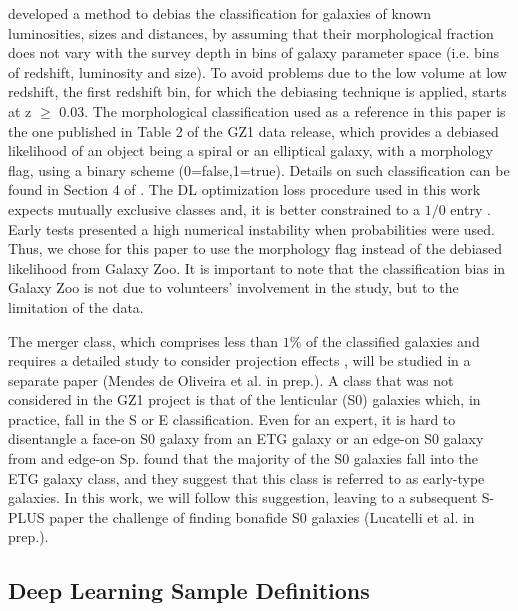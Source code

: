 \documentclass[fleqn,usenatbib]{mnras}
\begin{document}
 \cite{bamford2009galaxy} developed a method to debias the classification for galaxies of known luminosities, sizes and distances, by assuming that their morphological fraction does not vary with the survey depth in bins of galaxy parameter space (i.e. bins of redshift, luminosity and size). To avoid problems due to the low volume at low redshift, the first redshift bin, for which the debiasing technique is applied, starts at z $\geq$ 0.03.
 The morphological classification used as a reference in this paper is the one  published in Table 2 of the GZ1 data release, which provides a debiased likelihood of an object being a spiral or an elliptical galaxy, with a morphology flag, using a binary scheme (0=false,1=true). Details on such classification can be found in Section 4 of \citet{lintott2011}.
 The DL optimization loss procedure used  in this work expects mutually exclusive classes and, it is better constrained to a $1/0$ entry \citep{chollet2018deep}. Early tests presented a high numerical instability when probabilities were used. Thus, we chose for this paper to use the morphology flag instead of the debiased likelihood from Galaxy Zoo. It is important to note that the classification bias in Galaxy Zoo is not due to volunteers' involvement in the study, but to the limitation of the data.  

The merger class, which comprises less than $1\%$ of the classified galaxies and requires a detailed study to consider projection effects \citep{Darg2010a,Darg2010b}, will be studied in a separate paper  (Mendes de Oliveira et al. in prep.). A class that was not considered in the GZ1 project is that of the lenticular (S0) galaxies which, in practice, fall in the S or E classification. Even for an expert, it is hard to disentangle a face-on S0 galaxy from an ETG galaxy or an edge-on S0 galaxy from and edge-on Sp. \citet{bamford2009galaxy} found that the majority of the S0 galaxies fall into the ETG galaxy class, and they suggest that this class is referred to as early-type galaxies. In this work, we will follow this suggestion, leaving to a subsequent S-PLUS paper the challenge of finding bonafide S0 galaxies (Lucatelli et al. in prep.).


\subsection{Deep Learning Sample Definitions}
\end{document}
